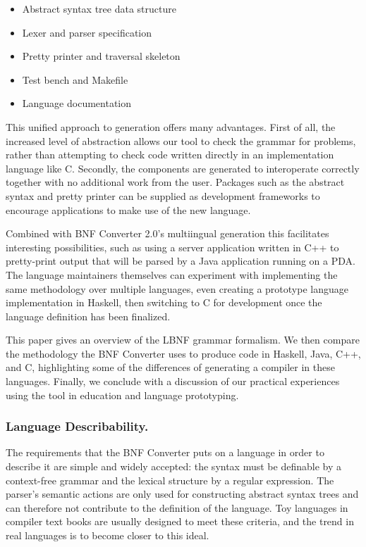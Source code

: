 \documentclass{llncs}
\newcommand{\shortsection}[1]{\subsubsection*{#1.}} %
\begin{document}
\begin{itemize}
\item Abstract syntax tree data structure
\item Lexer and parser specification
\item Pretty printer and traversal skeleton
\item Test bench and Makefile
\item Language documentation
\end{itemize}

This unified approach to generation offers many advantages. First of all,
the increased level of abstraction allows our tool to check the grammar
for problems, rather than attempting to check code written directly in an
implementation language like C. Secondly, the components are generated to
interoperate correctly together with no additional work from the user.
Packages such as the abstract syntax and pretty printer can be supplied as
development frameworks to encourage applications to make use of the new
language.

Combined with BNF Converter 2.0's multiingual generation this facilitates
interesting possibilities, such as using a server application written in
C++ to pretty-print output that will be parsed by a Java application
running on a PDA. The language maintainers themselves can experiment with
implementing the same methodology over multiple languages, even creating a
prototype language implementation in Haskell, then switching to C for
development once the language definition has been finalized.


This paper gives an overview of the LBNF grammar formalism. We then
compare the methodology the BNF Converter uses to produce code in Haskell,
Java, C++, and C, highlighting some of the differences of generating a
compiler in these languages. Finally, we conclude with a discussion of our
practical experiences using the tool in education and language
prototyping.


\shortsection{Language Describability}

The requirements that the BNF Converter puts on a language in order to
describe it are simple and widely accepted: the syntax must be definable
by a context-free grammar and the lexical structure by a regular expression.
The parser's semantic actions are only used for constructing abstract
syntax trees and can therefore not contribute to the definition of
the language.
Toy languages in compiler text books are usually designed to meet these
criteria, and the trend in real languages is to become closer to this ideal.
\end{document}
